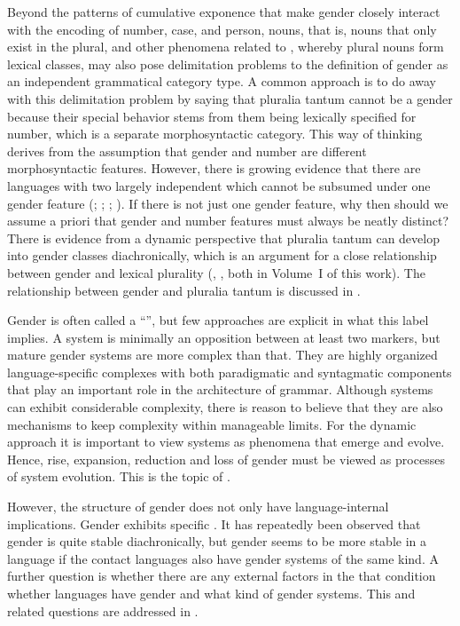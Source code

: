 \documentclass[output=collectionpaper]{langsci/langscibook}
\begin{document}
Beyond the patterns of cumulative exponence that make gender closely interact with the encoding of number, case, and person,  nouns, that is, nouns that only exist in the plural, and other phenomena related to , whereby plural nouns form lexical classes, may also pose delimitation problems to the definition of gender as an independent grammatical category type. A common approach is to do away with this delimitation problem by saying that pluralia tantum cannot be a gender because their special behavior stems from them being lexically specified for number, which is a separate morphosyntactic category. This way of thinking derives from the assumption that gender and number are different morphosyntactic features. However, there is growing evidence that there are languages with two largely independent  which cannot be subsumed under one gender feature (\citealt{Fedden2017}; \citealt{Corbett2017}; ; ). If there is not just one gender feature, why then should we assume a priori that gender and number features must always be neatly distinct? There is evidence from a dynamic perspective that pluralia tantum can develop into gender classes diachronically, which is an argument for a close relationship between gender and lexical plurality (\citealt{chapters/07}, \citealt{chapters/08}, both in Volume~I of this work). The relationship between gender and pluralia tantum is discussed in .

Gender is often called a ``'', but few approaches are explicit in what this label implies. A system is minimally an opposition between at least two markers, but mature gender systems are more complex than that. They are highly organized language-specific complexes with both paradigmatic and syntagmatic components that play an important role in the architecture of grammar. Although systems can exhibit considerable complexity, there is reason to believe that they are also mechanisms to keep complexity within manageable limits. For the dynamic approach it is important to view systems as phenomena that emerge and evolve. Hence, rise, expansion, reduction and loss of gender must be viewed as processes of system evolution. This is the topic of .

However, the structure of gender does not only have language-internal implications. Gender exhibits specific . It has repeatedly been observed that gender is quite stable diachronically, but gender seems to be more stable in a language if the contact languages also have gender systems of the same kind. A further question is whether there are any external factors in the  that condition whether languages have gender and what kind of gender systems. This and related questions are addressed in .
\end{document}
